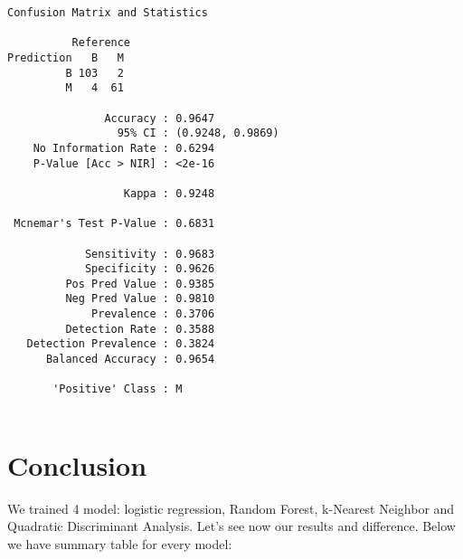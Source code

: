 \documentclass[]{article}
\newenvironment{Shaded}{\begin{snugshade}}{\end{snugshade}}
\newcommand{\ControlFlowTok}[1]{\textcolor[rgb]{0.13,0.29,0.53}{\textbf{#1}}}
\newcommand{\DataTypeTok}[1]{\textcolor[rgb]{0.13,0.29,0.53}{#1}}
\newcommand{\KeywordTok}[1]{\textcolor[rgb]{0.13,0.29,0.53}{\textbf{#1}}}
\newcommand{\NormalTok}[1]{#1}
\newcommand{\OperatorTok}[1]{\textcolor[rgb]{0.81,0.36,0.00}{\textbf{#1}}}
\newcommand{\StringTok}[1]{\textcolor[rgb]{0.31,0.60,0.02}{#1}}
\begin{document}
\begin{verbatim}
Confusion Matrix and Statistics

          Reference
Prediction   B   M
         B 103   2
         M   4  61
                                          
               Accuracy : 0.9647          
                 95% CI : (0.9248, 0.9869)
    No Information Rate : 0.6294          
    P-Value [Acc > NIR] : <2e-16          
                                          
                  Kappa : 0.9248          
                                          
 Mcnemar's Test P-Value : 0.6831          
                                          
            Sensitivity : 0.9683          
            Specificity : 0.9626          
         Pos Pred Value : 0.9385          
         Neg Pred Value : 0.9810          
             Prevalence : 0.3706          
         Detection Rate : 0.3588          
   Detection Prevalence : 0.3824          
      Balanced Accuracy : 0.9654          
                                          
       'Positive' Class : M               
                                          
\end{verbatim}

\hypertarget{conclusion}{%
\section{Conclusion}\label{conclusion}}

We trained 4 model: logistic regression, Random Forest, k-Nearest
Neighbor and Quadratic Discriminant Analysis. Let's see now our results
and difference. Below we have summary table for every model:

\begin{Shaded}
\end{Shaded}
\end{document}
